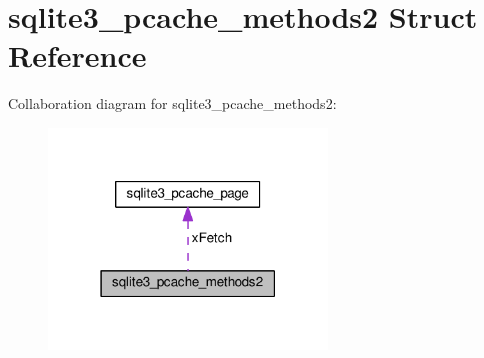 \hypertarget{structsqlite3__pcache__methods2}{}\section{sqlite3\+\_\+pcache\+\_\+methods2 Struct Reference}
\label{structsqlite3__pcache__methods2}


Collaboration diagram for sqlite3\+\_\+pcache\+\_\+methods2\+:\nopagebreak
\begin{figure}[H]
\begin{center}
\leavevmode
\includegraphics[width=210pt]{structsqlite3__pcache__methods2__coll__graph}
\end{center}
\end{figure}
